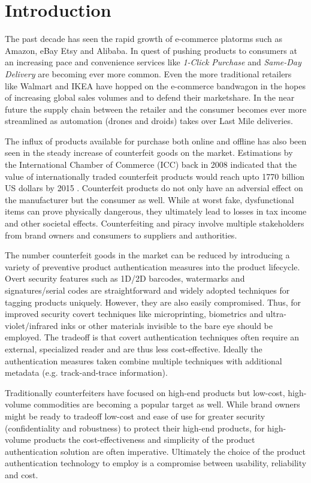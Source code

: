 \documentclass[thesis.tex]{subfiles}
\begin{document}
\chapter{Introduction}
\label{chapter:intro}

\enlargethispage{2\baselineskip}
The past decade has seen the rapid growth of e-commerce platorms such as Amazon, eBay Etsy and Alibaba. In quest of pushing products to consumers at an increasing pace and convenience services like \emph{1-Click Purchase} and \emph{Same-Day Delivery} are becoming ever more common. Even the more traditional retailers like Walmart and IKEA have hopped on the e-commerce bandwagon in the hopes of increasing global sales volumes and to defend their marketshare. In the near future the supply chain between the retailer and the consumer becomes ever more streamlined as automation (drones and droids) takes over Last Mile deliveries.

The influx of products available for purchase both online and offline has also been seen in the steady increase of counterfeit goods on the market. Estimations by the International Chamber of Commerce (ICC) back in 2008 indicated that the value of internationally traded counterfeit products would reach upto 1770 billion US dollars by 2015 \cite{icc}. Counterfeit products do not only have an adversial effect on the manufacturer but the consumer as well. While at worst fake, dysfunctional items can prove physically dangerous, they ultimately lead to losses in tax income and other societal effects. Counterfeiting and piracy involve multiple stakeholders from brand owners and consumers to suppliers and authorities.

The number counterfeit goods in the market can be reduced by introducing a variety of preventive product authentication measures into the product lifecycle. Overt security features such as 1D/2D barcodes, watermarks and signatures/serial codes are straightforward and widely adopted techniques for tagging products uniquely. However, they are also easily compromised. Thus, for improved security covert techniques like microprinting, biometrics and ultra-violet/infrared inks or other materials invisible to the bare eye should be employed. The tradeoff is that covert authentication techniques often require an external, specialized reader and are thus less cost-effective. Ideally the authentication measures taken combine multiple techniques with additional metadata (e.g. track-and-trace information).

Traditionally counterfeiters have focused on high-end products but low-cost, high-volume commodities are becoming a popular target as well. While brand owners might be ready to tradeoff low-cost and ease of use for greater security (confidentiality and robustness) to protect their high-end products, for high-volume products the cost-effectiveness and simplicity of the product authentication solution are often imperative. Ultimately the choice of the product authentication technology to employ is a compromise between usability, reliability and cost.
\end{document}
